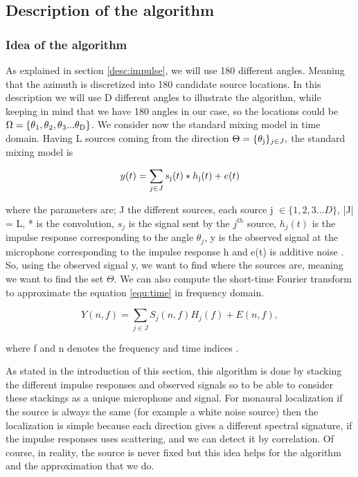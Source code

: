 \subsection{Description of the algorithm }

\subsubsection{Idea of the algorithm} \label{sect:idea}

As explained in section \ref{desc:impulse}, we will use 180 different angles. Meaning that the azimuth is discretized into 180 candidate source locations. In this description we will use D different angles to illustrate the algorithm, while keeping in mind that we have 180 angles in our case, so the locations could be $\Omega = \{\theta\textsubscript{1}, \theta\textsubscript{2}, \theta\textsubscript{3} ... \theta\textsubscript{D}\}$. We consider now the standard mixing model in time domain. Having L sources coming from the direction $\Theta = \{\theta\textsubscript{j}\}_{j\in J} ,$ the standard mixing model is 

\begin{equation}
    y(t) = \sum_{j\in J} s\textsubscript{j}(t)*h\textsubscript{j}(t) + e(t)
    \label{equ:time}
\end{equation}

where the parameters are; J the different sources, each source j $\in \{1, 2, 3 ... D\}$, |J| = L, * is the convolution, $s_j$ is the signal sent by the $j^{th}$ source, $h_j(t)$ is the impulse response corresponding to the angle $\theta_j$, y is the observed signal at the microphone corresponding to the impulse response h and e(t) is additive noise \cite{dalia}\cite{falSchro}. So, using the observed signal y, we want to find where the sources are, meaning we want to find the set $\Theta$. We can also compute the short-time Fourier transform to approximate the equation \ref{equ:time} in frequency domain. 

\begin{equation}
    Y(n,f) = \sum_{j \in J} S_j(n,f)H_j(f) + E(n,f),
\end{equation}

where f and n denotes the frequency and time indices \cite{dalia}\cite{falSchro}.

As stated in the introduction of this section, this algorithm is done by stacking the different impulse responses and observed signals so to be able to consider these stackings as a unique microphone and signal. For monaural localization if the source is always the same (for example a white noise source) then the localization is simple because each direction gives a different spectral signature, if the impulse responses uses scattering, and we can detect it by correlation. Of course, in reality, the source is never fixed but this idea helps for the algorithm and the approximation that we do.

